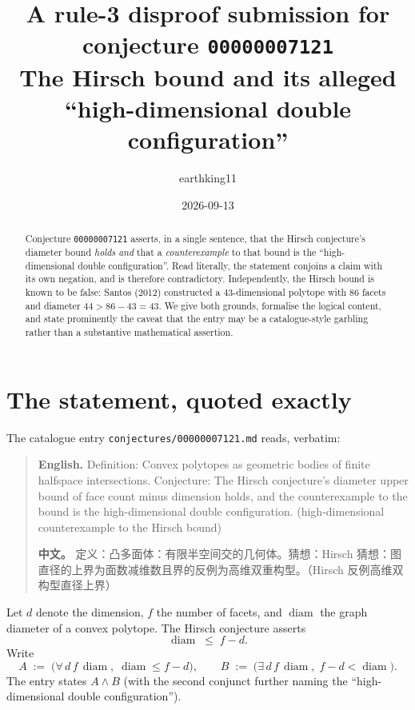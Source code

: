 \documentclass[11pt]{article}
\title{A rule-3 disproof submission for conjecture \texttt{00000007121}\\
       \large The Hirsch bound and its alleged ``high-dimensional double configuration''}
\author{earthking11}
\date{2026-09-13}
\theoremstyle{remark}
\begin{document}
\maketitle

\begin{abstract}
Conjecture \texttt{00000007121} asserts, in a single sentence, that the
Hirsch conjecture's diameter bound \emph{holds} \emph{and} that a
\emph{counterexample} to that bound is the ``high-dimensional double
configuration''. Read literally, the statement conjoins a claim with its own
negation, and is therefore contradictory. Independently, the Hirsch bound is
known to be false: Santos (2012) constructed a $43$-dimensional polytope with
$86$ facets and diameter $44 > 86 - 43 = 43$. We give both grounds, formalise
the logical content, and state prominently the caveat that the entry may be a
catalogue-style garbling rather than a substantive mathematical assertion.
\end{abstract}

\section{The statement, quoted exactly}

The catalogue entry \texttt{conjectures/00000007121.md} reads, verbatim:

\begin{quote}
\textbf{English.} Definition: Convex polytopes as geometric bodies of finite
halfspace intersections. Conjecture: The Hirsch conjecture's diameter upper
bound of face count minus dimension holds, and the counterexample to the bound
is the high-dimensional double configuration. (high-dimensional counterexample
to the Hirsch bound)

\textbf{中文。} 定义：凸多面体：有限半空间交的几何体。猜想：Hirsch 猜想：图直径的上界为面数减维数且界的反例为高维双重构型。（Hirsch 反例高维双构型直径上界）
\end{quote}

Let $d$ denote the dimension, $f$ the number of facets, and $\operatorname{diam}$
the graph diameter of a convex polytope. The Hirsch conjecture asserts
\begin{equation}\label{eq:hirsch}
  \operatorname{diam} \;\le\; f - d .
\end{equation}
Write
\[
  A \;:=\; \bigl(\forall\, d\, f\, \operatorname{diam},\;
        \operatorname{diam} \le f - d\bigr),
  \qquad
  B \;:=\; \bigl(\exists\, d\, f\, \operatorname{diam},\;
        f - d < \operatorname{diam}\bigr).
\]
The entry states $A \land B$ (with the second conjunct further naming the
``high-dimensional double configuration'').
\end{document}
